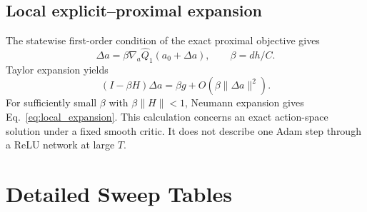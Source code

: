 \subsection{Local explicit--proximal expansion}
The statewise first-order condition of the exact proximal objective gives
\begin{equation*}
 \Delta a=\beta\nabla_a\widehat Q_1(a_0+\Delta a),\qquad \beta=dh/C.
\end{equation*}
Taylor expansion yields
\begin{equation*}
 (I-\beta H)\Delta a=\beta g+O(\beta\|\Delta a\|^2).
\end{equation*}
For sufficiently small $\beta$ with $\beta\|H\|<1$, Neumann expansion gives Eq.~\eqref{eq:local_expansion}. This calculation concerns an exact action-space solution under a fixed smooth critic. It does not describe one Adam step through a ReLU network at large $T$.

\section{Detailed Sweep Tables}
\label{app:tables}

\begin{table}[t]
\centering
\caption{Mean score over nine tasks at each nominal budget. P denotes MPI-Prox and L denotes MPI-Lin.}
\label{tab:budget_means}
\scriptsize
{}
\end{table}

